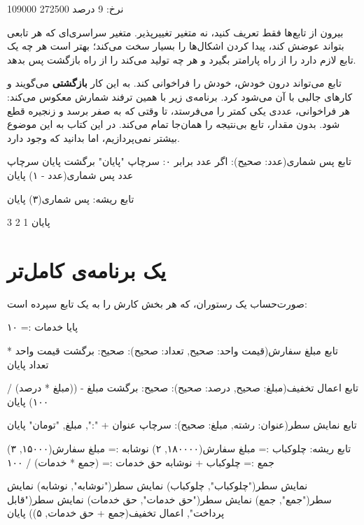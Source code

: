 \begin{outputfa}
109000
272500
نرخ: 9 درصد
\end{outputfa}

بیرون از تابع‌ها فقط  تعریف کنید، نه متغیر تغییرپذیر. متغیر
سراسری‌ای که هر تابعی بتواند عوضش کند، پیدا کردن اشکال‌ها را بسیار سخت
می‌کند؛ بهتر است هر چه یک تابع لازم دارد را از راه پارامتر بگیرد و هر چه
تولید می‌کند را از راه بازگشت پس بدهد.

\begin{deep}
تابع می‌تواند درون خودش، خودش را فراخوانی کند. به این کار
\textbf{بازگشتی} می‌گویند و کارهای جالبی با آن می‌شود کرد. برنامه‌ی زیر
با همین ترفند شمارش معکوس می‌کند: هر فراخوانی، عددی یکی کمتر را
می‌فرستد، تا وقتی که به صفر برسد و زنجیره قطع شود.  بدون
مقدار، تابع بی‌نتیجه را همان‌جا تمام می‌کند. در این کتاب به این موضوع
بیشتر نمی‌پردازیم، اما بدانید که وجود دارد.
\end{deep}

\begin{salamfa}
تابع پس شماری(عدد: صحیح):
    اگر عدد برابر ۰:
        سرچاپ "پایان"
        برگشت
    پایان
    سرچاپ عدد
    پس شماری(عدد - ۱)
پایان

تابع ریشه:
    پس شماری(۳)
پایان
\end{salamfa}
\begin{outputfa}
3
2
1
پایان
\end{outputfa}

\section{یک برنامه‌ی کامل‌تر}

صورت‌حساب یک رستوران، که هر بخش کارش را به یک تابع سپرده است:

\begin{salamfa}
پایا خدمات := ۱۰

تابع مبلغ سفارش(قیمت واحد: صحیح, تعداد: صحیح): صحیح:
    برگشت قیمت واحد * تعداد
پایان

تابع اعمال تخفیف(مبلغ: صحیح, درصد: صحیح): صحیح:
    برگشت مبلغ - ((مبلغ * درصد) / ۱۰۰)
پایان

تابع نمایش سطر(عنوان: رشته, مبلغ: صحیح):
    سرچاپ عنوان + ":", مبلغ, "تومان"
پایان

تابع ریشه:
    چلوکباب := مبلغ سفارش(۱۸۰۰۰۰, ۲)
    نوشابه := مبلغ سفارش(۱۵۰۰۰, ۳)
    جمع := چلوکباب + نوشابه
    حق خدمات := (جمع * خدمات) / ۱۰۰

    نمایش سطر("چلوکباب", چلوکباب)
    نمایش سطر("نوشابه", نوشابه)
    نمایش سطر("جمع", جمع)
    نمایش سطر("حق خدمات", حق خدمات)
    نمایش سطر("قابل پرداخت", اعمال تخفیف(جمع + حق خدمات, ۵))
پایان
\end{salamfa}


